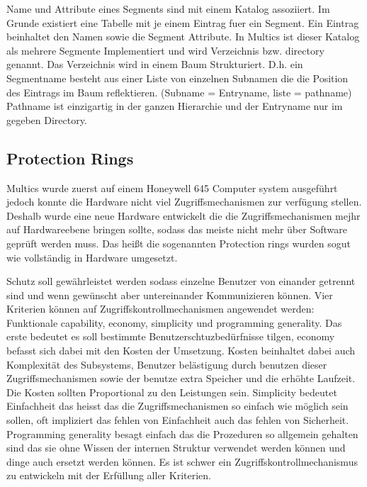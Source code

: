 \documentclass[9pt,technote]{IEEEtran}
\begin{document}
 Name und Attribute eines Segments sind mit einem Katalog assoziiert. Im Grunde existiert eine Tabelle mit je einem Eintrag fuer ein Segment. 
 Ein Eintrag beinhaltet den Namen sowie die Segment Attribute. In Multics ist dieser Katalog als mehrere
 Segmente Implementiert und wird Verzeichnis bzw. directory genannt. Das Verzeichnis wird in einem Baum Strukturiert.
 D.h. ein Segmentname besteht aus einer Liste von einzelnen Subnamen die die Position des Eintrags im Baum reflektieren. (Subname = Entryname, liste = pathname)
 Pathname ist einzigartig in der ganzen Hierarchie und der Entryname nur im gegeben Directory.
  \subsection{Protection Rings}
    Multics wurde zuerst auf einem Honeywell 645 Computer system ausgef\"uhrt jedoch konnte die Hardware nicht viel Zugriffsmechanismen zur verf\"ugung stellen.
    Deshalb wurde eine neue Hardware entwickelt die die Zugriffsmechanismen mejhr auf Hardwareebene bringen sollte, sodass das meiste nicht mehr \"uber Software
    gepr\"uft werden muss. Das hei\ss t die sogenannten Protection rings wurden sogut wie vollst\"andig in Hardware umgesetzt. \cite{inproc:protec-rings}
    
  
    Schutz soll gew\"ahrleistet werden sodass einzelne Benutzer von einander getrennt sind und wenn gew\"unscht aber untereinander Kommunizieren k\"onnen.
    Vier Kriterien k\"onnen auf Zugriffskontrollmechanismen angewendet werden: Funktionale capability, economy, simplicity und programming generality.
    Das erste bedeutet es soll bestimmte Benutzerschtuzbed\"urfnisse tilgen, economy befasst sich dabei mit den Kosten der Umsetzung.
    Kosten beinhaltet dabei auch Komplexit\"at des Subsystems, Benutzer bel\"astigung durch benutzen dieser Zugriffsmechanismen sowie der benutze
    extra Speicher und die erh\"ohte Laufzeit. Die Kosten sollten Proportional zu den Leistungen sein.
    Simplicity bedeutet Einfachheit das heisst das die Zugriffsmechanismen so einfach wie m\"oglich sein sollen, oft
    impliziert das fehlen von Einfachheit auch das fehlen von Sicherheit. Programming generality besagt einfach das die Prozeduren so allgemein gehalten sind
    das sie ohne Wissen der internen Struktur verwendet werden k\"onnen und dinge auch ersetzt werden k\"onnen.
    Es ist schwer ein Zugriffskontrollmechanismus zu entwickeln mit der Erf\"ullung aller Kriterien.
    
\end{document}

